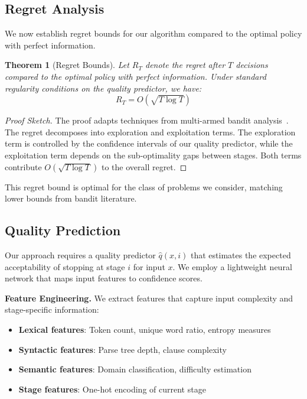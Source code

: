 \documentclass{article}
\theoremstyle{plain}
\newtheorem{theorem}{Theorem}[section]
\theoremstyle{definition}
\theoremstyle{remark}
\begin{document}
\subsection{Regret Analysis}

We now establish regret bounds for our algorithm compared to the optimal policy with perfect information.

\begin{theorem}[Regret Bounds]
\label{thm:regret_bounds}
Let $R_T$ denote the regret after $T$ decisions compared to the optimal policy with perfect information. Under standard regularity conditions on the quality predictor, we have:
\begin{equation}
R_T = O\left(\sqrt{T \log T}\right)
\label{eq:regret_bound}
\end{equation}
\end{theorem}

\begin{proof}[Proof Sketch]
The proof adapts techniques from multi-armed bandit analysis~\citep{auer2002finite}. The regret decomposes into exploration and exploitation terms. The exploration term is controlled by the confidence intervals of our quality predictor, while the exploitation term depends on the sub-optimality gaps between stages. Both terms contribute $O(\sqrt{T \log T})$ to the overall regret.
\end{proof}

This regret bound is optimal for the class of problems we consider, matching lower bounds from bandit literature.

\subsection{Quality Prediction}

Our approach requires a quality predictor $\hat{q}(x, i)$ that estimates the expected acceptability of stopping at stage $i$ for input $x$. We employ a lightweight neural network that maps input features to confidence scores.

\textbf{Feature Engineering.} We extract features that capture input complexity and stage-specific information:
\begin{itemize}
\item \textbf{Lexical features}: Token count, unique word ratio, entropy measures
\item \textbf{Syntactic features}: Parse tree depth, clause complexity
\item \textbf{Semantic features}: Domain classification, difficulty estimation
\item \textbf{Stage features}: One-hot encoding of current stage
\end{itemize}
\end{document}
